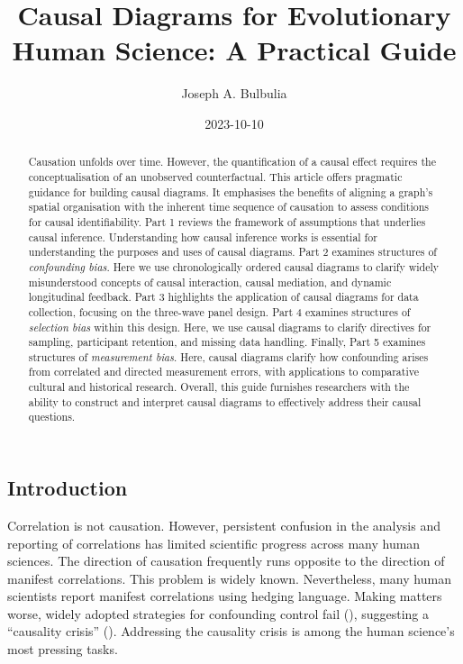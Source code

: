\documentclass[
  singlecolumn]{article}
\title{Causal Diagrams for Evolutionary Human Science: A Practical
Guide}
\author{Joseph A. Bulbulia}
\affil{%
                  Victoria University of Wellington, New Zealand, School
                  of Psychology, Centre for Applied Cross-Cultural
                  Research
              }
\date{2023-10-10}
\begin{document}
\maketitle
\begin{abstract}
Causation unfolds over time. However, the quantification of a causal
effect requires the conceptualisation of an unobserved counterfactual.
This article offers pragmatic guidance for building causal diagrams. It
emphasises the benefits of aligning a graph's spatial organisation with
the inherent time sequence of causation to assess conditions for causal
identifiability. Part 1 reviews the framework of assumptions that
underlies causal inference. Understanding how causal inference works is
essential for understanding the purposes and uses of causal diagrams.
Part 2 examines structures of \emph{confounding bias}. Here we use
chronologically ordered causal diagrams to clarify widely misunderstood
concepts of causal interaction, causal mediation, and dynamic
longitudinal feedback. Part 3 highlights the application of causal
diagrams for data collection, focusing on the three-wave panel design.
Part 4 examines structures of \emph{selection bias} within this design.
Here, we use causal diagrams to clarify directives for sampling,
participant retention, and missing data handling. Finally, Part 5
examines structures of \emph{measurement bias}. Here, causal diagrams
clarify how confounding arises from correlated and directed measurement
errors, with applications to comparative cultural and historical
research. Overall, this guide furnishes researchers with the ability to
construct and interpret causal diagrams to effectively address their
causal questions.
\end{abstract}
\subsection{Introduction}\label{introduction}

Correlation is not causation. However, persistent confusion in the
analysis and reporting of correlations has limited scientific progress
across many human sciences. The direction of causation frequently runs
opposite to the direction of manifest correlations. This problem is
widely known. Nevertheless, many human scientists report manifest
correlations using hedging language. Making matters worse, widely
adopted strategies for confounding control fail
(), suggesting a ``causality
crisis'' (). Addressing the
causality crisis is among the human science's most pressing tasks.
\end{document}
